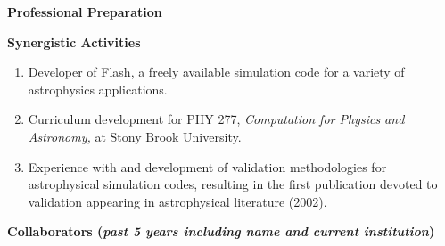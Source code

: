 \documentclass[11pt,letterpaper,english]{article}
\begin{document}
{\begin{flushleft} {\bf Professional Preparation}

\vspace{.04in}
{\bf Synergistic Activities}
\vspace{-6pt}
\begin{enumerate} \itemsep1pt \parskip0pt 

\item Developer of Flash, a freely available simulation code for
a variety of astrophysics applications. \\
\item Curriculum development for PHY 277, {\em Computation for Physics and
Astronomy,} at Stony Brook University. \\
\item Experience with and development of validation methodologies for
astrophysical simulation codes, resulting in the first publication
devoted to validation appearing in astrophysical literature (2002). \\
\end{enumerate} 

\vspace{-6pt}
{\bf Collaborators ({\emph{past 5 years including name and current institution}})} 
{\parindent 16pt

}
\end{flushleft}}
\end{document}

